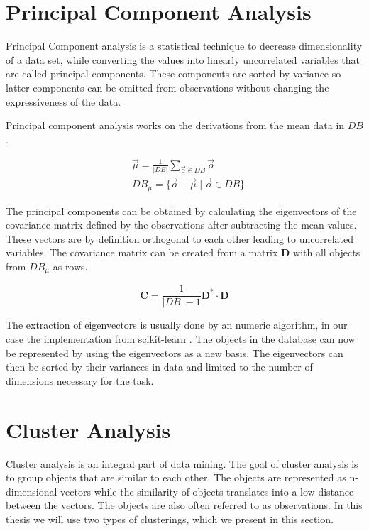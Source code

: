 \documentclass[pdftex,12pt,a4paper]{report}
\begin{document}
\section{Principal Component Analysis}
\label{section:pca}

Principal Component analysis is a statistical technique to decrease dimensionality of a data set, while converting the values into linearly uncorrelated variables that are called principal components. These components are sorted by variance so latter components can be omitted from observations without changing the expressiveness of the data.

Principal component analysis works on the derivations from the mean data in $DB$.

\begin{equation}
\begin{split}
& \vec{\mu} = \frac{1}{|DB|} \sum_{\vec{o} \in DB}  \vec{o} \\
& DB_\mu = \{ \vec{o} - \vec{\mu} \mid \vec{o} \in DB \}
\end{split}
\end{equation}

The principal components can be obtained by calculating the eigenvectors of the covariance matrix defined by the observations after subtracting the mean values. These vectors are by definition orthogonal to each other leading to uncorrelated variables. The covariance matrix can  be created from a matrix $\mathbf{D}$ with all objects from $DB_\mu$ as rows.

\begin{equation}
\mathbf{C} = \frac{1}{|DB|-1} \mathbf{D}^* \cdot \mathbf{D}
\end{equation}

The extraction of eigenvectors is usually done by an numeric algorithm, in our case the implementation from scikit-learn \cite{pedregosa2011scikit}. The objects in the database can now be represented by using the eigenvectors as a new basis. The eigenvectors can then be sorted by their variances in data and limited to the number of dimensions necessary for the task.

\section{Cluster Analysis}

Cluster analysis is an integral part of data mining. The goal of cluster analysis is to group objects that are similar to each other. The objects are represented as n-dimensional vectors while the similarity of objects translates into a low distance between the vectors. The objects are also often referred to as observations. In this thesis we will use two types of clusterings, which we present in this section.
\end{document}

